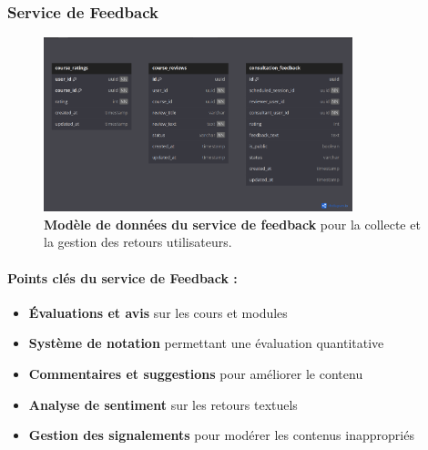 \subsubsection{Service de Feedback}
\begin{figure}[p]
  \centering
  \includegraphics[width=0.8\textwidth,keepaspectratio]{week_1_img/services_db_screanshots/Screenshot 2025-06-06 at 15-08-00 Feedback_Service.pdf.png}
  \caption{\textbf{Modèle de données du service de feedback} pour la collecte et la gestion des retours utilisateurs.}
  \label{fig:feedback_service}
\end{figure}

\vspace{5pt}
\small
\paragraph{Points clés du service de Feedback :}
\begin{itemize}[leftmargin=*,noitemsep,topsep=0pt]
  \item \textbf{Évaluations et avis} sur les cours et modules
  \item \textbf{Système de notation} permettant une évaluation quantitative
  \item \textbf{Commentaires et suggestions} pour améliorer le contenu
  \item \textbf{Analyse de sentiment} sur les retours textuels
  \item \textbf{Gestion des signalements} pour modérer les contenus inappropriés
\end{itemize}
\normalsize
\clearpage

